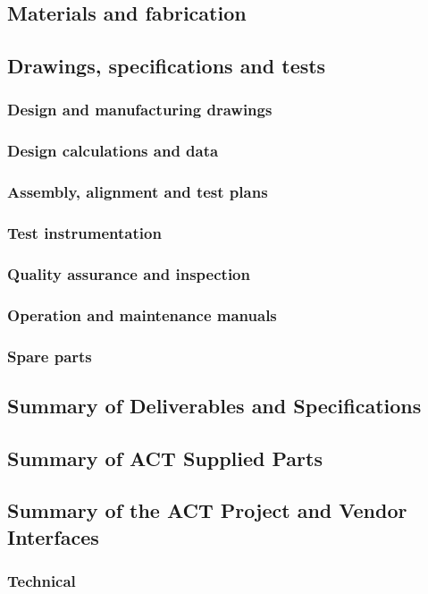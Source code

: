 \documentclass[12pt,letter]{article}
\begin{document}
\subsection{Materials and fabrication}
\subsection{Drawings, specifications and tests}
    \subsubsection{Design and manufacturing drawings}
    \subsubsection{Design calculations and data}
    \subsubsection{Assembly, alignment and test plans}
    \subsubsection{Test instrumentation}
    \subsubsection{Quality assurance and inspection}
    \subsubsection{Operation and maintenance manuals}
    \subsubsection{Spare parts}
\subsection{Summary of Deliverables and Specifications}
\subsection{Summary of ACT Supplied Parts}
\subsection{Summary of the ACT Project and Vendor Interfaces}
    \subsubsection{Technical}
\end{document}
